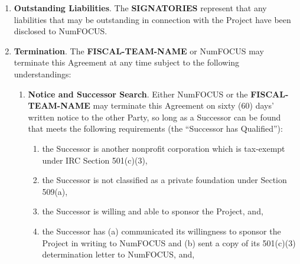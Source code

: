 \documentclass[english,letterpaper,12pt]{article}
\newcommand{\signatories}{\textbf{SIGNATORIES}}
\newcommand{\fiscalteam}{\textbf{FISCAL-TEAM-NAME}}
\begin{document}
\begin{enumerate}[label=\arabic*.,ref=\S~\arabic*]
  If two (2) or more members have a signifcant financial interest with the same
  for-profit entity or share an affiliation with a non-profit entity (such as
  working for the same University), such information must be declared in
  writing to NumFOCUS. If the NumFOCUS Board of Directors determines by a
  majority vote that a conflict of interest does exist, they may require the
  team to change the composition of its \fiscalteam{} within 30 days.

  If NumFOCUS identifies a conflict of interest that is not covered by the
  language above, NumFOCUS reserves the right to require the team to change the
  composition of its \fiscalteam{} within 30 days.

\item \textbf{Outstanding Liabilities}. The \signatories{} represent that any
  liabilities that may be outstanding in connection with the Project have been
  disclosed to NumFOCUS.

\item \textbf{Termination}. \label{Termination} The \fiscalteam{} or
  NumFOCUS may terminate this Agreement at any time subject to the following
  understandings:

\begin{enumerate}[label=\alph*.,ref=\theenumi(\arabic*)]

\item \textbf{Notice and Successor Search}. Either NumFOCUS or the
  \fiscalteam{} may terminate this Agreement on sixty (60) days' written
  notice to the other Party, so long as a Successor can be found that meets the
  following requirements (the ``Successor has Qualified''):


\begin{enumerate}[label=\roman*.,ref=\theenumi(\alph{enumii})(\roman*)]
  
\item the Successor is another nonprofit corporation which is tax-exempt under
  IRC Section 501(c)(3),
  
\item the Successor is not classified as a private foundation under Section
  509(a),
  
\item the Successor is willing and able to sponsor the Project, and,
  
\item the Successor has (a) communicated its willingness to sponsor the Project
  in writing to NumFOCUS and (b) sent a copy of its 501(c)(3) determination
  letter to NumFOCUS, and,
  

\end{enumerate}
\end{enumerate}
\end{enumerate}
\end{document}
